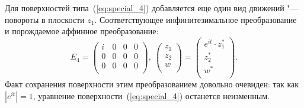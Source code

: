 \documentclass[../main.tex]{subfiles}
\begin{document}
Для поверхностей типа~(\ref{eq:special_4}) добавляется еще один вид движений "--- повороты в плоскости $z_1$. Соответствующее инфинитезимальное преобразование и порождаемое аффинное преобразование:
\begin{equation*}
E_4 = \left(
\begin{array}{cccc}
 i & 0 & 0 & 0 \\
 0 & 0 & 0 & 0 \\
 0 & 0 & 0 & 0 \\
\end{array}
\right),~
\left(
\begin{array}{c}
 z_1 \\
 z_2 \\
 w \\
\end{array}
\right) =
\left(
\begin{array}{c}
 e^{it} \cdot z_1^* \\
 z_2^* \\
 w^* \\
\end{array}
\right).
\end{equation*}
Факт сохранения поверхности этим преобразованием довольно очевиден: так как $|e^{it}| = 1$, уравнение поверхности~(\ref{eq:special_4}) останется неизменным.
\end{document}
